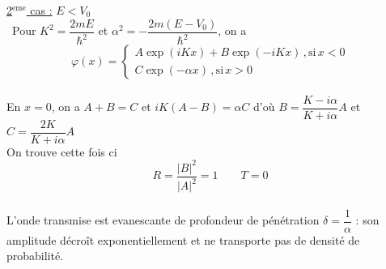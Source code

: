 \documentclass[a4paper]{article}
\begin{document}
\underline{2$^{\mathrm{eme}}$ cas :} \( E < V_0 \)\\\
Pour \( K^2 = \dfrac{2mE}{\hbar^2} \) et \( \alpha^2 = -\dfrac{2m(E - V_0)}{\hbar^2}  \), on a \[ \varphi(x) = \left\{\begin{array}{l} A\exp(iKx) + B\exp( - iKx)\,,\mathrm{si}\,x < 0 \\ C\exp(-\alpha x)\,,\mathrm{si}\,x > 0 \end{array}\right. \]\\
En \( x = 0 \), on a \( A + B = C \) et \( iK(A - B) = \alpha C \) d'où \( B = \dfrac{K - i\alpha}{K + i\alpha} A \) et \( C = \dfrac{2K}{K + i\alpha}A \)\\
On trouve cette fois ci \[ R = \dfrac{|B|^2}{|A|^2} = 1 \qquad T = 0 \]\\
L'onde transmise est evanescante de profondeur de pénétration \( \delta = \dfrac{1}{\alpha} \) : son amplitude décroît exponentiellement et ne transporte pas de densité de probabilité.
\end{document}
